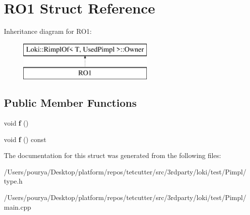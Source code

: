 \hypertarget{structRO1}{}\section{R\+O1 Struct Reference}
\label{structRO1}
Inheritance diagram for R\+O1\+:\begin{figure}[H]
\begin{center}
\leavevmode
\includegraphics[height=2.000000cm]{structRO1}
\end{center}
\end{figure}
\subsection*{Public Member Functions}
\begin{DoxyCompactItemize}
\item 
\hypertarget{structRO1_a2628ff39f74b733d2028bcff7a263915}{}void {\bfseries f} ()\label{structRO1_a2628ff39f74b733d2028bcff7a263915}

\item 
\hypertarget{structRO1_a4386efa6943a067130eb28aa12fce09f}{}void {\bfseries f} () const \label{structRO1_a4386efa6943a067130eb28aa12fce09f}

\end{DoxyCompactItemize}


The documentation for this struct was generated from the following files\+:\begin{DoxyCompactItemize}
\item 
/\+Users/pourya/\+Desktop/platform/repos/tetcutter/src/3rdparty/loki/test/\+Pimpl/type.\+h\item 
/\+Users/pourya/\+Desktop/platform/repos/tetcutter/src/3rdparty/loki/test/\+Pimpl/main.\+cpp\end{DoxyCompactItemize}

